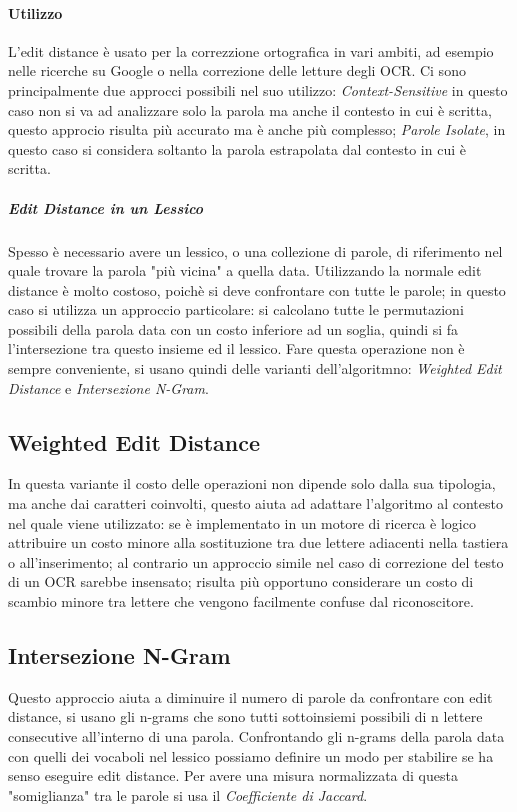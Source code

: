 \documentclass{article}
\begin{document}
\paragraph{Utilizzo}
L'edit distance è usato per la correzzione ortografica in vari ambiti, ad esempio nelle ricerche su Google o nella correzione delle letture degli OCR. Ci sono principalmente due approcci possibili nel suo utilizzo: {\itshape Context-Sensitive} in questo caso non si va ad analizzare solo la parola ma anche il contesto in cui è scritta, questo approcio risulta più accurato ma è anche più complesso; {\itshape Parole Isolate}, in questo caso si considera soltanto la parola estrapolata dal contesto in cui è scritta.
\subparagraph{Edit Distance in un Lessico}
Spesso è necessario avere un lessico, o una collezione di parole, di riferimento nel quale trovare la parola "più vicina" a quella data. Utilizzando la normale edit distance è molto costoso, poichè si deve confrontare con tutte le parole; in questo caso si utilizza un approccio particolare: si calcolano tutte le permutazioni possibili della parola data con un costo inferiore ad un soglia, quindi si fa l'intersezione tra questo insieme ed il lessico.
Fare questa operazione non è sempre conveniente, si usano quindi delle varianti dell'algoritmno: {\itshape Weighted Edit Distance} e {\itshape Intersezione N-Gram}. 
\subsection{Weighted Edit Distance}
In questa variante il costo delle operazioni non dipende solo dalla sua tipologia, ma anche dai caratteri coinvolti, questo aiuta ad adattare l'algoritmo al contesto nel quale viene utilizzato: se è implementato in un motore di ricerca è logico attribuire un costo minore alla sostituzione tra due lettere adiacenti nella tastiera o all'inserimento; al contrario un approccio simile nel caso di correzione del testo di un OCR sarebbe insensato; risulta più opportuno considerare un costo di scambio minore tra lettere che vengono facilmente confuse dal riconoscitore.
\subsection{Intersezione N-Gram}
Questo approccio aiuta a diminuire il numero di parole da confrontare con edit distance, si usano gli n-grams che sono tutti sottoinsiemi possibili di n lettere consecutive all'interno di una parola. Confrontando gli n-grams della parola data con quelli dei vocaboli nel lessico possiamo definire un modo per stabilire se ha senso eseguire edit distance.
Per avere una misura normalizzata di questa "somiglianza" tra le parole si usa il {\itshape Coefficiente di Jaccard}.
\end{document}
